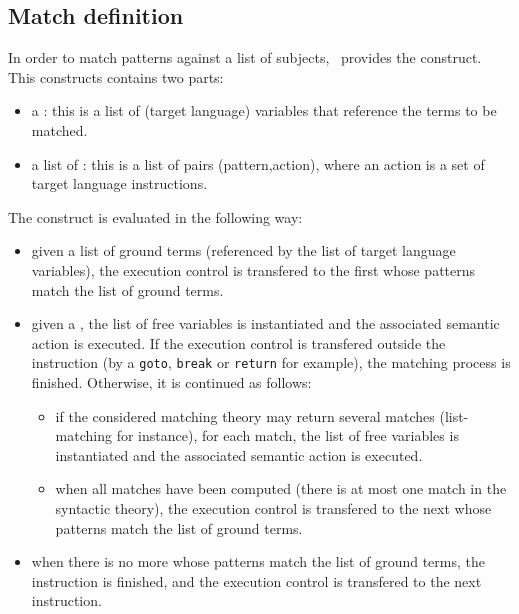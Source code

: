\subsection{Match definition}
In order to match patterns against a list of subjects, \TOM\ provides
the  construct.
This constructs contains two parts:
\begin{itemize}
\item a : this is a list of (target
  language) variables that reference the terms to be matched.
\item a list of : this is a list of pairs
  (pattern,action), where an action is a set of target language
  instructions.  
\end{itemize}

The  construct is evaluated in the following way:
\begin{itemize}
\item given a list of ground terms (referenced by the list of target
  language variables), the execution control is transfered to the
  first  whose patterns match the list of ground
  terms.
\item given a , the list of free variables is
  instantiated and the associated semantic action is executed.
  If the execution control is transfered outside the
   instruction (by a \texttt{goto}, \texttt{break} or
  \texttt{return} for example), the matching process is finished.
  Otherwise, it is continued as follows:
  \begin{itemize}
  \item if the considered matching theory may return several matches
    (list-matching for instance), for each match, the list of free
    variables is instantiated and the associated semantic action is
    executed.
  \item when all matches have been computed (there is at most one match
    in the syntactic theory), the execution control is transfered to
    the next  whose patterns match the list of
    ground terms. 
  \end{itemize}

\item when there is no more  whose patterns
  match the list of ground terms, the  instruction is
  finished, and the execution control is transfered to the next
  instruction. 
\end{itemize}

